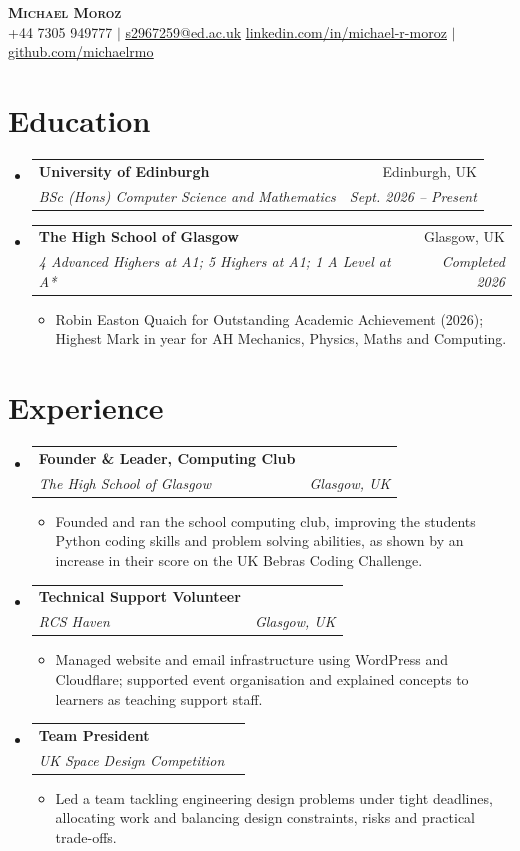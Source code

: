 \documentclass[letterpaper,11pt]{article}
\makeatletter
\newcommand{\resumeItem}[1]{\item\small{{#1\vspace{-2pt}}}}
\newcommand{\resumeSubheading}[4]{
  \vspace{-2pt}\item
  \begin{tabular*}{0.97\textwidth}[t]{l@{\extracolsep{\fill}}r}
    \textbf{#1} & #2 \\
    \textit{\small#3} & \textit{\small#4} \\
  \end{tabular*}\vspace{-7pt}}
\newcommand{\resumeSubHeadingListStart}{\begin{itemize}[leftmargin=0.15in,label={}]}
\newcommand{\resumeSubHeadingListEnd}{\end{itemize}}
\newcommand{\resumeItemListStart}{\begin{itemize}}
\newcommand{\resumeItemListEnd}{\end{itemize}\vspace{-5pt}}
\makeatother
\begin{document}
\begin{center}
  \textbf{\Huge\scshape Michael Moroz} \\ \vspace{2pt}
  \small +44 7305 949777 $|$ \href{mailto:s2967259@ed.ac.uk}{\underline{s2967259@ed.ac.uk}} 
  \href{https://www.linkedin.com/in/michael-r-moroz}{\underline{linkedin.com/in/michael-r-moroz}} $|$
  \href{https://github.com/michaelrmo}{\underline{github.com/michaelrmo}}
\end{center}

\section{Education}
\resumeSubHeadingListStart
  \resumeSubheading{University of Edinburgh}{Edinburgh, UK}
    {BSc (Hons) Computer Science and Mathematics}{Sept. 2026 -- Present}
  \resumeSubheading{The High School of Glasgow}{Glasgow, UK}
    {4 Advanced Highers at A1; 5 Highers at A1; 1 A Level at A*}{Completed 2026}
  \resumeItemListStart
    \resumeItem{Robin Easton Quaich for Outstanding Academic Achievement (2026); Highest Mark in year for AH Mechanics, Physics, Maths and Computing.}
  \resumeItemListEnd
\resumeSubHeadingListEnd

\section{Experience}
\resumeSubHeadingListStart
  \resumeSubheading{Founder \& Leader, Computing Club}{}
    {The High School of Glasgow}{Glasgow, UK}
  \resumeItemListStart
    \resumeItem{Founded and ran the school computing club, improving the students Python coding skills and problem solving abilities, as shown by an increase in their score on the UK Bebras Coding Challenge.}
  \resumeItemListEnd
  \resumeSubheading{Technical Support Volunteer}{}
    {RCS Haven}{Glasgow, UK}
  \resumeItemListStart
    \resumeItem{Managed website and email infrastructure using WordPress and Cloudflare; supported event organisation and explained concepts to learners as teaching support staff.}
  \resumeItemListEnd
  \resumeSubheading{Team President}{}
    {UK Space Design Competition}{}
  \resumeItemListStart
    \resumeItem{Led a team tackling engineering design problems under tight deadlines, allocating work and balancing design constraints, risks and practical trade-offs.}
  \resumeItemListEnd
 

\resumeSubHeadingListEnd
\end{document}
